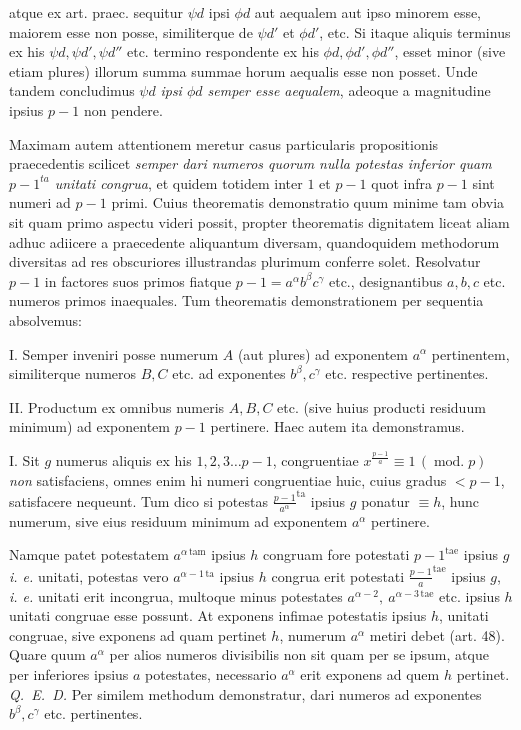 atque ex art. praec. sequitur $\psi d$ ipsi $\phi d$ aut aequalem aut ipso minorem esse, maiorem esse non posse, similiterque de $\psi d'$ et $\phi d'$, etc. Si itaque aliquis terminus ex his $\psi d,\psi d',\psi d''$ etc. termino respondente ex his $\phi d,\phi d',\phi d''$, esset minor (sive etiam plures) illorum summa summae horum aequalis esse non posset. Unde tandem concludimus $\psi d$ \emph{ipsi $\phi d$ semper esse aequalem}, adeoque a magnitudine ipsius $p-1$ non pendere.


Maximam autem attentionem meretur casus particularis propositionis praecedentis scilicet \emph{semper dari numeros quorum nulla potestas inferior quam $p-1^{ta}$ unitati congrua}, et quidem totidem inter $1$ et $p-1$ quot infra $p-1$ sint numeri ad $p-1$ primi. Cuius theorematis demonstratio quum minime tam obvia sit quam primo aspectu videri possit, propter theorematis dignitatem liceat aliam adhuc adiicere a praecedente aliquantum diversam, quandoquidem methodorum diversitas ad res obscuriores illustrandas plurimum conferre solet. Resolvatur $p-1$ in factores suos primos fiatque $p-1=a^\alpha b^\beta c^\gamma$ etc., designantibus $a,b,c$ etc. numeros primos inaequales. Tum theorematis demonstrationem per sequentia absolvemus:

I. Semper inveniri posse numerum $A$ (aut plures) ad exponentem $a^\alpha$ pertinentem, similiterque numeros $B,C$ etc. ad exponentes $b^\beta,c^\gamma$ etc. respective pertinentes.

II. Productum ex omnibus numeris $A,B,C$ etc. (sive huius producti residuum minimum) ad exponentem $p-1$ pertinere. Haec autem ita demonstramus.

I. Sit $g$ numerus aliquis ex his $1,2,3\ldots p-1$, congruentiae $x^{\frac{p-1}{a}}\equiv1\,(\operatorname{mod.}p)$ \emph{non} satisfaciens, omnes enim hi numeri congruentiae huic, cuius gradus $<p-1$, satisfacere nequeunt. Tum dico si potestas ${\frac{p-1}{a^\alpha}}^{\mathrm{ta}}$ ipsius $g$ ponatur $\equiv h$, hunc numerum, sive eius residuum minimum ad exponentem $a^\alpha$ pertinere.

Namque patet potestatem $a^{\alpha\,\mathrm{tam}}$ ipsius $h$ congruam fore potestati $p-1^{\mathrm{tae}}$ ipsius $g$ \emph{i. e.} unitati, potestas vero $a^{\alpha-1\,\mathrm{ta}}$ ipsius $h$ congrua erit potestati ${\frac{p-1}{a}}^{\mathrm{tae}}$ ipsius $g$, \emph{i. e.} unitati erit incongrua, multoque minus potestates $a^{\alpha-2},\ a^{\alpha-3\,\mathrm{tae}}$ etc. ipsius $h$ unitati congruae esse possunt. At exponens infimae potestatis ipsius $h$, unitati congruae, sive exponens ad quam pertinet $h$, numerum $a^\alpha$ metiri debet (art. 48). Quare quum $a^\alpha$ per alios numeros divisibilis non sit quam per se ipsum, atque per inferiores ipsius $a$ potestates, necessario $a^\alpha$ erit exponens ad quem $h$ pertinet. \mbox{\emph{Q. E. D.}} Per similem methodum demonstratur, dari numeros ad exponentes $b^\beta,c^\gamma$ etc. pertinentes.

